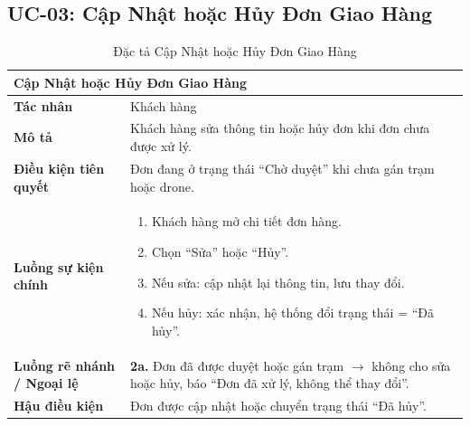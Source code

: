 \subsection{UC-03: Cập Nhật hoặc Hủy Đơn Giao Hàng}
\begin{table}[H]
  \centering
  \begin{tabularx}{\textwidth}{|l|X|}
    \hline
    \multicolumn{2}{|l|}{\textbf{Cập Nhật hoặc Hủy Đơn Giao Hàng}} \\
    \hline
    \textbf{Tác nhân}           & Khách hàng \\ \hline
    \textbf{Mô tả}              & Khách hàng sửa thông tin hoặc hủy đơn khi đơn chưa được xử lý. \\ \hline
    \textbf{Điều kiện tiên quyết} & Đơn đang ở trạng thái ``Chờ duyệt'' khi chưa gán trạm hoặc drone. \\ \hline
    \textbf{Luồng sự kiện chính} &
      \begin{enumerate}[leftmargin=*, nosep, topsep=0pt]
        \item Khách hàng mở chi tiết đơn hàng.
        \item Chọn ``Sửa'' hoặc ``Hủy''.
        \item Nếu sửa: cập nhật lại thông tin, lưu thay đổi.
        \item Nếu hủy: xác nhận, hệ thống đổi trạng thái = ``Đã hủy''.
      \end{enumerate} \\ \hline
    \textbf{Luồng rẽ nhánh / Ngoại lệ} &
      \textbf{2a.} Đơn đã được duyệt hoặc gán trạm $\rightarrow$ không cho sửa hoặc hủy, báo ``Đơn đã xử lý, không thể thay đổi''. \\ \hline
    \textbf{Hậu điều kiện}      & Đơn được cập nhật hoặc chuyển trạng thái ``Đã hủy''. \\
    \hline
  \end{tabularx}
  \caption{Đặc tả Cập Nhật hoặc Hủy Đơn Giao Hàng}
  \label{tab:uc03}
\end{table}

